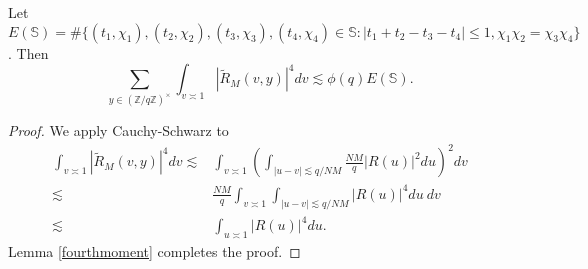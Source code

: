 \begin{lemma}\label{fourthmoment_smooth}
    Let $E(\mathbb{S})=\#\{(t_1,\chi_1),(t_2,\chi_2),(t_3,\chi_3),(t_4,\chi_4)\in \mathbb{S}  :  |t_1+t_2-t_3-t_4|\leq 1, \chi_1\chi_2=\chi_3\chi_4\}$. Then \[
        \sum_{y\in (\mathbb{Z}/q\mathbb{Z})^\times} \int_{v\asymp 1} 
        \left|\tilde{R}_M\left(v,y\right)\right|^4dv  \lesssim \phi(q)E(\mathbb{S}).
    \]
\end{lemma}
\begin{proof}
    We apply Cauchy-Schwarz to \begin{align*}
        \int_{v\asymp 1} 
        \left|\tilde{R}_M\left(v,y\right)\right|^4dv  \lesssim& \int_{v\asymp 1} 
        \left(\int_{|u-v|\lesssim q/NM}
        \frac{NM}{q}|R(u)|^2 du\right)^2
        dv \\
        \lesssim& \frac{NM}{q} \int_{v\asymp 1} 
       \int_{|u-v|\lesssim q/NM}
        |R(u)|^4 du \ 
        dv\\
        \lesssim&  
        \int_{u\asymp 1}
         |R(u)|^4 du.
    \end{align*}
    Lemma \ref{fourthmoment} completes the proof.
\end{proof}

